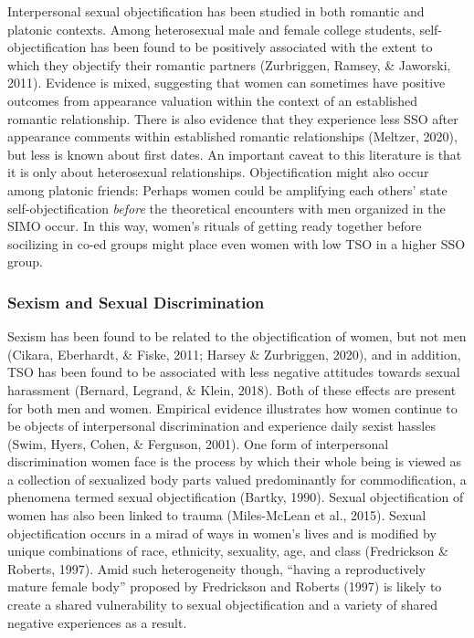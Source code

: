 \documentclass[man]{apa6}
\begin{document}
Interpersonal sexual objectification has been studied in both romantic
and platonic contexts. Among heterosexual male and female college
students, self-objectification has been found to be positively
associated with the extent to which they objectify their romantic
partners (Zurbriggen, Ramsey, \& Jaworski, 2011). Evidence is mixed,
suggesting that women can sometimes have positive outcomes from
appearance valuation within the context of an established romantic
relationship. There is also evidence that they experience less SSO after
appearance comments within established romantic relationships (Meltzer,
2020), but less is known about first dates. An important caveat to this
literature is that it is only about heterosexual relationships.
Objectification might also occur among platonic friends: Perhaps women
could be amplifying each others' state self-objectification
\emph{before} the theoretical encounters with men organized in the SIMO
occur. In this way, women's rituals of getting ready together before
socilizing in co-ed groups might place even women with low TSO in a
higher SSO group.

\subsubsection{Sexism and Sexual
Discrimination}\label{sexism-and-sexual-discrimination}

Sexism has been found to be related to the objectification of women, but
not men (Cikara, Eberhardt, \& Fiske, 2011; Harsey \& Zurbriggen, 2020),
and in addition, TSO has been found to be associated with less negative
attitudes towards sexual harassment (Bernard, Legrand, \& Klein, 2018).
Both of these effects are present for both men and women. Empirical
evidence illustrates how women continue to be objects of interpersonal
discrimination and experience daily sexist hassles (Swim, Hyers, Cohen,
\& Ferguson, 2001). One form of interpersonal discrimination women face
is the process by which their whole being is viewed as a collection of
sexualized body parts valued predominantly for commodification, a
phenomena termed sexual objectification (Bartky, 1990). Sexual
objectification of women has also been linked to trauma (Miles-McLean et
al., 2015). Sexual objectification occurs in a mirad of ways in women's
lives and is modified by unique combinations of race, ethnicity,
sexuality, age, and class (Fredrickson \& Roberts, 1997). Amid such
heterogeneity though, \enquote{having a reproductively mature female
body} proposed by Fredrickson and Roberts (1997) is likely to create a
shared vulnerability to sexual objectification and a variety of shared
negative experiences as a result.
\end{document}
